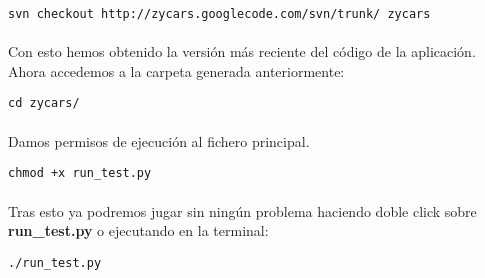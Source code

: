 \begin{lstlisting}[style=consola, numbers=none]
svn checkout http://zycars.googlecode.com/svn/trunk/ zycars
\end{lstlisting}

\paragraph{}
Con esto hemos obtenido la versión más reciente del código de la aplicación. Ahora accedemos a la carpeta generada
anteriormente:

\begin{lstlisting}[style=consola, numbers=none]
cd zycars/
\end{lstlisting}

\paragraph{}
Damos permisos de ejecución al fichero principal.

\begin{lstlisting}[style=consola, numbers=none]
chmod +x run_test.py
\end{lstlisting}

\paragraph{}
Tras esto ya podremos jugar sin ningún problema haciendo doble click sobre \textbf{run\_test.py} o ejecutando en la terminal:
\begin{lstlisting}[style=consola, numbers=none]
./run_test.py
\end{lstlisting}

